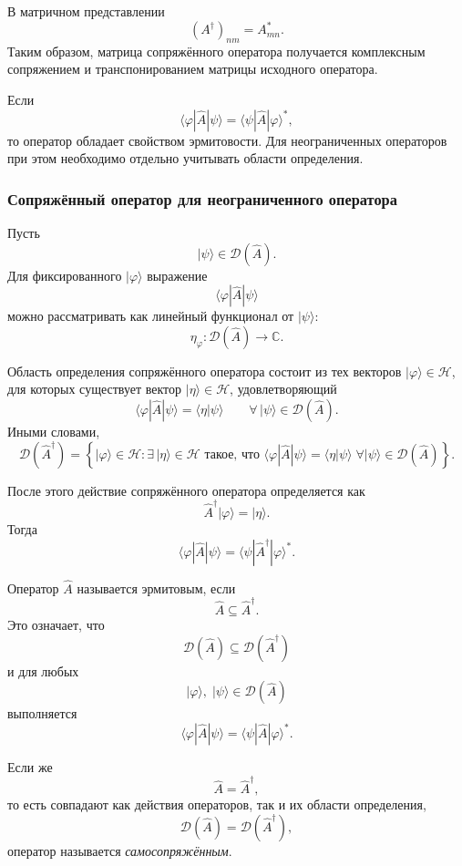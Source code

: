 \documentclass[12pt,a4paper]{article}
\begin{document}
В матричном представлении
\[
    \boxed{
        (A^\dagger)_{nm}
        =
        A_{mn}^*
    }.
\]
Таким образом, матрица сопряжённого оператора получается комплексным
сопряжением и транспонированием матрицы исходного оператора.

Если
\[
    \langle\varphi|\hat A|\psi\rangle
    =
    \langle\psi|\hat A|\varphi\rangle^*,
\]
то оператор обладает свойством эрмитовости. Для неограниченных
операторов при этом необходимо отдельно учитывать области определения.

\subsubsection{Сопряжённый оператор для неограниченного оператора}

Пусть
\[
    |\psi\rangle\in\mathcal D(\hat A).
\]
Для фиксированного $|\varphi\rangle$ выражение
\[
    \langle\varphi|\hat A|\psi\rangle
\]
можно рассматривать как линейный функционал от $|\psi\rangle$:
\[
    \eta_\varphi:
    \mathcal D(\hat A)\to\mathbb C.
\]

Область определения сопряжённого оператора состоит из тех векторов
$|\varphi\rangle\in\mathcal H$, для которых существует вектор
$|\eta\rangle\in\mathcal H$, удовлетворяющий
\[
    \boxed{
    \langle\varphi|\hat A|\psi\rangle
    =
    \langle\eta|\psi\rangle
    \qquad
    \forall\,|\psi\rangle\in\mathcal D(\hat A)
    }.
\]
Иными словами,
\[
\boxed{
\mathcal D(\hat A^\dagger)
=
\left\{
|\varphi\rangle\in\mathcal H:
\exists\,|\eta\rangle\in\mathcal H
\text{ такое, что }
\langle\varphi|\hat A|\psi\rangle
=
\langle\eta|\psi\rangle
\;
\forall|\psi\rangle\in\mathcal D(\hat A)
\right\}
}.
\]

После этого действие сопряжённого оператора определяется как
\[
    \boxed{
        \hat A^\dagger|\varphi\rangle
        =
        |\eta\rangle
    }.
\]
Тогда
\[
    \boxed{
    \langle\varphi|\hat A|\psi\rangle
    =
    \langle\psi|\hat A^\dagger|\varphi\rangle^*
    }.
\]

Оператор $\hat A$ называется эрмитовым, если
\[
    \boxed{
        \hat A\subseteq\hat A^\dagger
    }.
\]
Это означает, что
\[
    \mathcal D(\hat A)
    \subseteq
    \mathcal D(\hat A^\dagger)
\]
и для любых
\[
    |\varphi\rangle,\;|\psi\rangle\in\mathcal D(\hat A)
\]
выполняется
\[
    \boxed{
        \langle\varphi|\hat A|\psi\rangle
        =
        \langle\psi|\hat A|\varphi\rangle^*
    }.
\]

Если же
\[
    \boxed{
        \hat A=\hat A^\dagger
    },
\]
то есть совпадают как действия операторов, так и их области
определения,
\[
    \boxed{
        \mathcal D(\hat A)
        =
        \mathcal D(\hat A^\dagger)
    },
\]
оператор называется \emph{самосопряжённым}.
\end{document}
